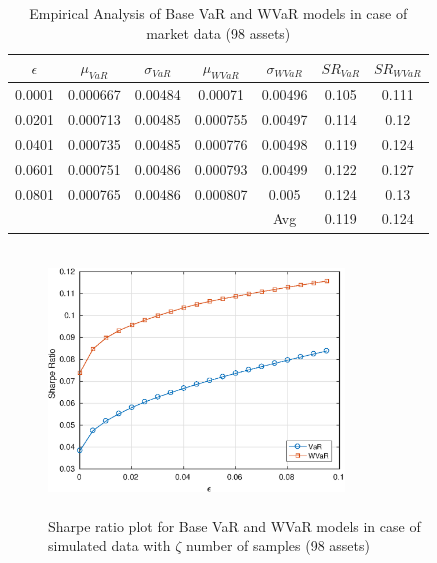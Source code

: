 \documentclass[12pt]{article}
\numberwithin{equation}{section}
\begin{document}
\begin{table}[!h]
\centering
\captionsetup{justification=centering}
\begin{tabular}{||c|c|c|c|c|c|c||}
\hline
$\epsilon$ & $\mu_{VaR}$ & $\sigma_{VaR}$ & $\mu_{WVaR}$ & $\sigma_{WVaR}$ & $SR_{VaR}$ & $SR_{WVaR}$\\
\hline
0.0001 & 0.000667 & 0.00484 & 0.00071 & 0.00496 & 0.105 & 0.111 \\
0.0201 & 0.000713 & 0.00485 & 0.000755 & 0.00497 & 0.114 & 0.12 \\
0.0401 & 0.000735 & 0.00485 & 0.000776 & 0.00498 & 0.119 & 0.124 \\
0.0601 & 0.000751 & 0.00486 & 0.000793 & 0.00499 & 0.122 & 0.127 \\
0.0801 & 0.000765 & 0.00486 & 0.000807 & 0.005 & 0.124 & 0.13 \\
\hline
& & & & Avg & 0.119 & 0.124 \\
\hline
\end{tabular}
\caption{Empirical Analysis of Base VaR and WVaR models in case of market data (98 assets)}
\label{tab:5.4}
\end{table}

\begin{figure}[!h]
\centering
\includegraphics[height=7.0cm,width=0.7\textwidth]{VaR/bse100_simulated/sr_exact_cheb.eps}
\caption{Sharpe ratio plot for Base VaR and WVaR models in case of simulated data with $\zeta$ number of samples (98 assets)}
\label{fig:5.5}
\end{figure}
\end{document}
